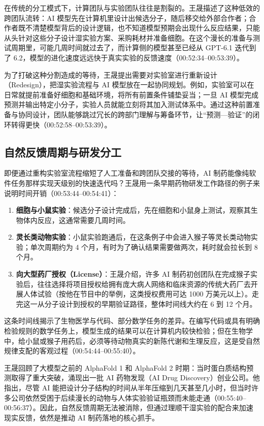 \documentclass[UTF8,a4paper,11pt,fontset=fandol]{ctexart}
\begin{document}
在传统的分工模式下，计算团队与实验团队往往是割裂的。王晟描述了这种低效的跨团队流转：AI 模型先在计算机里设计出候选分子，随后移交给外部合作者；合作者既不清楚模型背后的设计逻辑，也不知道模型预期会出现什么反应结果，只能从头针对这些分子设计湿实验方案、采购耗材并准备细胞。在这个漫长的准备与测试周期里，可能几周时间就过去了，而计算侧的模型甚至已经从 GPT-6.1 迭代到了 6.2，模型的进化速度远远快于真实实验的反馈速度（00:52:34–00:53:39）。

为了打破这种分割造成的等待，王晟提出需要对实验室进行重新设计（Redesign），把湿实验流程与 AI 模型放在一起协同规划。例如，实验室可以在日常就提前准备好细胞和基础环境，将所有前置条件铺垫妥当；一旦 AI 模型完成预测并输出特定小分子，实验人员就能立刻将其加入测试体系中。通过这种前置准备与协同设计，团队能够跳过冗长的跨部门理解与筹备环节，让“预测—验证”的闭环转得更快（00:52:58–00:53:39）。

\subsection{自然反馈周期与研发分工}
即便通过重构实验室流程缩短了人工准备和跨团队交接的等待，AI 制药能像纯软件任务那样实现天级别的快速迭代吗？王晟用一条早期药物研发工作路径的例子来说明时间开销（00:53:44–00:54:41）：
\begin{enumerate}
\item \textbf{细胞与小鼠实验}：候选分子设计完成后，先在细胞和小鼠身上测试，观察其生物体内反应，这通常需要几周时间。
\item \textbf{灵长类动物实验}：小鼠实验跑通后，在这条例子中会进入猴子等灵长类动物实验；单次周期约为 4 个月，有时为了确认结果需要做两次，耗时就会拉长到 8 个月。
\item \textbf{向大型药厂授权（License）}：王晟介绍，许多 AI 制药初创团队在完成猴子实验后，往往选择将项目授权给拥有庞大病人网络和临床资源的传统大药厂去开展人体试验（按他在节目中的举例，这类授权费用可达 1000 万美元以上）。走完这一从分子设计到授权的早期验证路径，整体时间线大约在 6 到 12 个月。
\end{enumerate}

这条时间线揭示了生物医学与代码、部分数学任务的差异。在编写代码或具有明确检验规则的数学任务上，模型生成的结果可以在计算机内较快检验；但在生物学中，给小鼠或猴子用药后，必须等待动物真实的新陈代谢和生理反应，这是受自然规律支配的客观过程（00:54:44–00:55:40）。

王晟回顾了大模型之前的 AlphaFold 1 和 AlphaFold 2 时期：当时蛋白质结构预测取得了重大突破，涌现出一批 AI 药物发现（AI Drug Discovery）创业公司。他指出，尽管 AI 能把设计分子结构的时间从半年压缩到几天甚至几小时，但当时许多公司依然受困于后续漫长的动物与人体实验验证瓶颈而未能走通（00:55:40–00:56:37）。因此，自然反馈周期无法被消除，但通过理顺干湿实验的配合来加速现实反馈，依然是推动 AI 制药落地的核心抓手。
\end{document}
